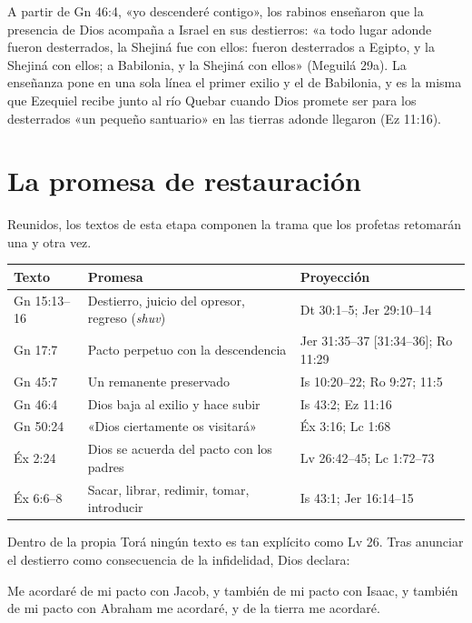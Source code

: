A partir de Gn 46:4, «yo descenderé contigo», los rabinos enseñaron que la presencia de Dios acompaña a Israel en sus destierros: «a todo lugar adonde fueron desterrados, la Shejiná fue con ellos: fueron desterrados a Egipto, y la Shejiná con ellos; a Babilonia, y la Shejiná con ellos» (Meguilá 29a). La enseñanza pone en una sola línea el primer exilio y el de Babilonia, y es la misma que Ezequiel recibe junto al río Quebar cuando Dios promete ser para los desterrados «un pequeño santuario» en las tierras adonde llegaron (Ez 11:16).

\section{La promesa de restauración}

Reunidos, los textos de esta etapa componen la trama que los profetas retomarán una y otra vez.

\begin{center}\small
\renewcommand{\arraystretch}{1.25}
\begin{tabular}{>{\RaggedRight\arraybackslash}p{2.6cm}>{\RaggedRight\arraybackslash}p{5.2cm}>{\RaggedRight\arraybackslash}p{6.1cm}}
\toprule
\textbf{Texto} & \textbf{Promesa} & \textbf{Proyección}\\
\midrule
Gn 15:13--16 & Destierro, juicio del opresor, regreso (\emph{shuv}) & Dt 30:1--5; Jer 29:10--14\\
Gn 17:7 & Pacto perpetuo con la descendencia & Jer 31:35--37 [31:34--36]; Ro 11:29\\
Gn 45:7 & Un remanente preservado & Is 10:20--22; Ro 9:27; 11:5\\
Gn 46:4 & Dios baja al exilio y hace subir & Is 43:2; Ez 11:16\\
Gn 50:24 & «Dios ciertamente os visitará» & Éx 3:16; Lc 1:68\\
Éx 2:24 & Dios se acuerda del pacto con los padres & Lv 26:42--45; Lc 1:72--73\\
Éx 6:6--8 & Sacar, librar, redimir, tomar, introducir & Is 43:1; Jer 16:14--15\\
\bottomrule
\end{tabular}\end{center}

Dentro de la propia Torá ningún texto es tan explícito como Lv 26. Tras anunciar el destierro como consecuencia de la infidelidad, Dios declara:

\begin{cita}Me acordaré de mi pacto con Jacob, y también de mi pacto con Isaac, y también de mi pacto con Abraham me acordaré, y de la tierra me acordaré.\end{cita}


